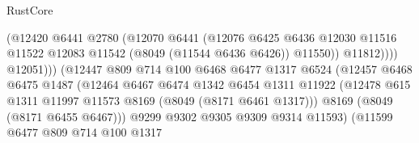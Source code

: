 \begin{lexlean}{RustCore}
\begin{coremodule}
                                          (@12420
                                            @6441
                                            @2780
                                            (@12070
                                              @6441
                                              (@12076
                                                @6425
                                                @6436
                                                @12030
                                                @11516
                                                @11522
                                                @12083
                                                @11542
                                                (@8049 (@11544 @6436 @6426))
                                                @11550))
                                            @11812))))
                                    @12051)))
                              (@12447
                                @809
                                @714
                                @100
                                @6468
                                @6477
                                @1317
                                @6524
                                (@12457
                                  @6468
                                  @6475
                                  @1487
                                  (@12464
                                    @6467
                                    @6474
                                    @1342
                                    @6454
                                    @1311
                                    @11922
                                    (@12478
                                      @615
                                      @1311
                                      @11997
                                      @11573
                                      @8169
                                      (@8049 (@8171 @6461 @1317)))
                                    @8169
                                    (@8049 (@8171 @6455 @6467)))
                                  @9299
                                  @9302
                                  @9305
                                  @9309
                                  @9314
                                  @11593)
                                (@11599
                                  @6477
                                  @809
                                  @714
                                  @100
                                  @1317

\end{coremodule}
\end{lexlean}
